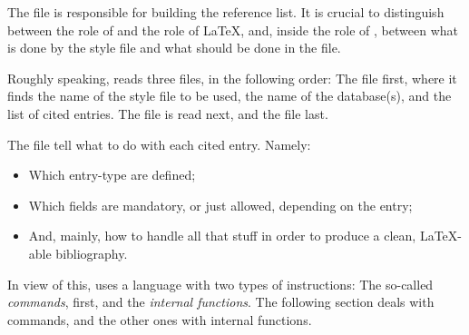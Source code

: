 %
% 
% 


\label{bst}
\parttoc
\mtcskip


The  file is responsible for building the reference list. It is
crucial to distinguish between the role of \bt and the role of \LaTeX, and,
inside the role of \bt,
between what is done by the style file and what should be done in the
 file. 

Roughly speaking, \bt reads three files, in the following order: The 
file first, where it finds the name of the style file to be used, the name of
the database(s), and the list of cited entries. The  file is read
next,  and the  file last. 

The  file tell \bt what to do with each cited entry. Namely:
\begin{itemize}
\item Which entry-type are defined;
\item Which fields are mandatory, or just allowed, depending on the entry;
\item And, mainly, how to handle all that stuff in order to produce a clean,
  \LaTeX-able bibliography.
\end{itemize}

In view of this, \bt uses a language with two types of instructions: The
so-called \emph{commands}, first, and the
\emph{internal functions}. The following section
deals with commands, and the other ones with internal functions.



